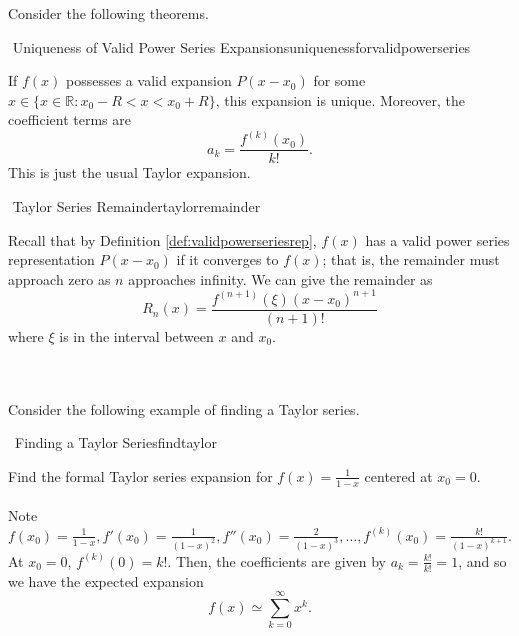         Consider the following theorems.
        \begin{theorem}{\Stop\,\,Uniqueness of Valid Power Series Expansions}{uniquenessforvalidpowerseries}
            
            If \(f(x)\) possesses a valid expansion \(P(x-x_0)\) for some \(x\in\{x\in\mathbb{R}:x_0-R<x<x_0+R\}\), this expansion is unique. Moreover, the coefficient terms are
            \begin{equation*}
                a_k=\frac{f^{(k)}(x_0)}{k!}.
            \end{equation*}
            This is just the usual Taylor expansion.
        \end{theorem}
        \begin{theorem}{\Stop\,\,Taylor Series Remainder}{taylorremainder}

            Recall that by Definition \ref{def:validpowerseriesrep}, \(f(x)\) has a valid power series representation \(P(x-x_0)\) if it converges to \(f(x)\); that is, the remainder must approach zero as \(n\) approaches infinity. We can give the remainder as
            \begin{equation*}
                R_n(x)=\frac{f^{(n+1)}(\xi)(x-x_0)^{n+1}}{(n+1)!}
            \end{equation*}
            where \(\xi\) is in the interval between \(x\) and \(x_0\).
            
        \end{theorem}
        \vphantom
        \\
        \\
        Consider the following example of finding a Taylor series.
        \begin{example}{\Difficulty\,\Difficulty\,\,Finding a Taylor Series}{findtaylor}
            
            Find the formal Taylor series expansion for \(f(x)=\frac{1}{1-x}\) centered at \(x_0=0\).
            \\
            \\
            Note \(f(x_0)=\frac{1}{1-x},f'(x_0)=\frac{1}{(1-x)^2}, f''(x_0)=\frac{2}{(1-x)^3},\ldots,f^{(k)}(x_0)=\frac{k!}{(1-x)^{k+1}}\). At \(x_0=0\), \(f^{(k)}(0)=k!\). Then, the coefficients are given by \(a_k=\frac{k!}{k!}=1\), and so we have the expected expansion
            \begin{equation*}
                f(x)\simeq\sum_{k=0}^\infty x^k.
            \end{equation*}

        \end{example}
